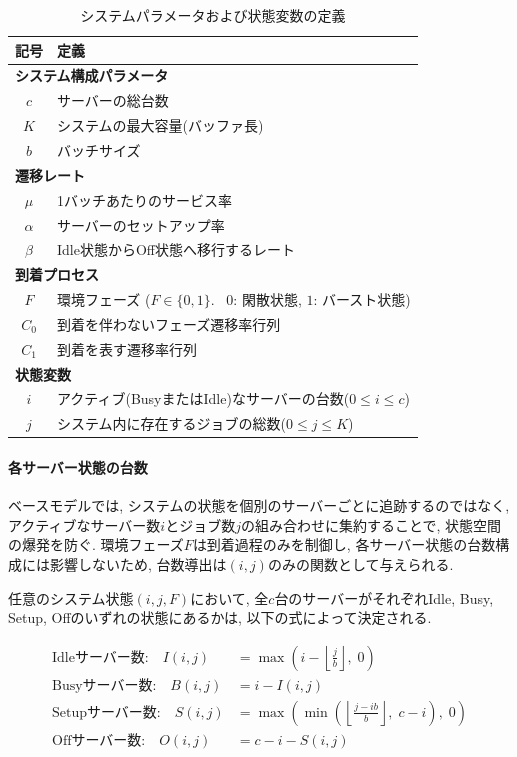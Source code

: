 \documentclass[a4paper, 11pt, dvipdfmx]{jsreport}
\begin{document}
\begin{table}[H]
\centering
\caption{システムパラメータおよび状態変数の定義}
\label{tab:parameters}
\begin{tabular}{cl}
\hline
記号 & 定義 \\
\hline
\multicolumn{2}{l}{\textbf{システム構成パラメータ}} \\
$c$ & サーバーの総台数 \\
$K$ & システムの最大容量(バッファ長) \\
$b$ & バッチサイズ\\
\multicolumn{2}{l}{\textbf{遷移レート}} \\
$\mu$ & 1バッチあたりのサービス率 \\
$\alpha$ & サーバーのセットアップ率 \\
$\beta$ & Idle状態からOff状態へ移行するレート\\
\multicolumn{2}{l}{\textbf{到着プロセス}}\\
$F$ & 環境フェーズ ($F \in \{0, 1\}$. \ $0$: 閑散状態, $1$: バースト状態) \\
$C_0$ & 到着を伴わないフェーズ遷移率行列\\
$C_1$ & 到着を表す遷移率行列\\
\multicolumn{2}{l}{\textbf{状態変数}} \\
$i$ & アクティブ(BusyまたはIdle)なサーバーの台数($0\le i\le c$) \\
$j$ & システム内に存在するジョブの総数($0\le j \le K$) \\
\hline
\end{tabular}
\end{table}

\paragraph{各サーバー状態の台数}
ベースモデルでは, システムの状態を個別のサーバーごとに追跡するのではなく, 
アクティブなサーバー数$i$とジョブ数$j$の組み合わせに集約することで, 状態空間の爆発を防ぐ. 環境フェーズ$F$は到着過程のみを制御し, 
各サーバー状態の台数構成には影響しないため, 台数導出は$(i, j)$のみの関数として与えられる. 

任意のシステム状態$(i, j, F)$において, 全$c$台のサーバーがそれぞれIdle, Busy, Setup, Offのいずれの状態にあるかは, 以下の式によって決定される. 

\begin{align}
    \text{Idleサーバー数:} \quad
        I(i, j) &= \max\!\left(i - \left\lfloor \frac{j}{b} \right\rfloor, \; 0\right) \label{eq:idle} \\
    \text{Busyサーバー数:} \quad
        B(i, j) &= i - I(i, j) \label{eq:busy} \\
    \text{Setupサーバー数:} \quad
        S(i, j) &= \max\!\left( \min\!\left( \left\lfloor \frac{j - i b}{b} \right\rfloor, \; c - i \right), \; 0 \right) \label{eq:setup} \\
    \text{Offサーバー数:} \quad
        O(i, j) &= c - i - S(i, j) \label{eq:off}
\end{align}
\end{document}
